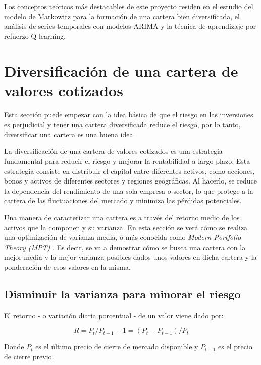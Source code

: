 
Los conceptos teóricos más destacables de este proyecto residen en el estudio del modelo de Markowitz para la formación de una cartera bien diversificada, el análisis de series temporales con modelos ARIMA y la técnica de aprendizaje por refuerzo Q-learning. 


\section{Diversificación de una cartera de valores cotizados}\label{diversificar_cartera}

Esta sección puede empezar con la idea básica de que el riesgo en las inversiones es perjudicial y tener una cartera diversificada reduce el riesgo, por lo tanto, diversificar una cartera es una buena idea. 

La diversificación de una cartera de valores cotizados es una estrategia fundamental para reducir el riesgo y mejorar la rentabilidad a largo plazo. Esta estrategia consiste en distribuir el capital entre diferentes activos, como acciones, bonos y activos de diferentes sectores y regiones geográficas. Al hacerlo, se reduce la dependencia del rendimiento de una sola empresa o sector, lo que protege a la cartera de las fluctuaciones del mercado y minimiza las pérdidas potenciales.

Una manera de caracterizar una cartera es a través del retorno medio de los activos que la componen y su varianza. En esta sección se verá cómo se realiza una optimización de varianza-media, o más conocida como \emph{Modern Portfolio Theory (MPT)} \citep{wiki:mpt}. Es decir, se va a demostrar cómo se busca una cartera con la mejor media y la mejor varianza posibles dados unos valores en dicha cartera y la ponderación de esos valores en la misma. 


\subsection{Disminuir la varianza para minorar el riesgo}

El retorno - o variación diaria porcentual - de un valor viene dado por:

\begin{equation}
	R = P_{t}/P_{t-1} - 1 = (P_{t} - P_{t-1})/P_{t}
\end{equation}

Donde $P_{t}$ es el último precio de cierre de mercado disponible y $P_{t-1}$ es el precio de cierre previo. 

